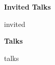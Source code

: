 \documentclass[11pt]{article}
\newcommand{\mysection}[1]{\vspace{1ex} \textbf{\large \textsf{#1} \quad \hrulefill}}
\begin{document}
\mysection{Invited Talks}
\begin{etaremune}
{{ invited }}
\end{etaremune}

\mysection{Talks}
\begin{etaremune}
{{ talks }}
\end{etaremune}








\end{document}
